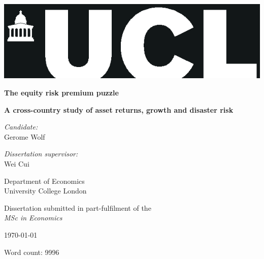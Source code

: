 \documentclass[
        a4paper,     %
        12pt,
        times,
        ]{article} %
\begin{document}
\begin{titlepage}
   \begin{center}

		\includegraphics[width=1\textwidth]{UCL_Banner}   
   
       \vspace*{1cm}
		
		\HUGE
		\textbf{The equity risk premium puzzle}

       \vspace{0.2cm}
       \Large
       \textbf{A cross-country study of asset returns, growth and disaster risk}
            
       \vspace{1cm}

       \textit{Candidate:}\\
       \vspace{0.5em}  
       Gerome Wolf
       
		\vspace{0.5cm}
		
		\textit{Dissertation supervisor:}\\
		\vspace{0.5em}  
       Wei Cui
		
       \vspace{1cm}
       
       \large
       Department of Economics\\
       \vspace{0.5em}  
       University College London\\
       
       \vfill
       
        \vspace{1cm}   
       Dissertation submitted in part-fulfilment of the\\
       \vspace{0.5em}  
       \textit{MSc in Economics}
            
       \vspace{1cm}
            
       \today
       
       \vspace{1cm}
       
       Word count: 9996
            
   \end{center}
\end{titlepage}
\end{document}
